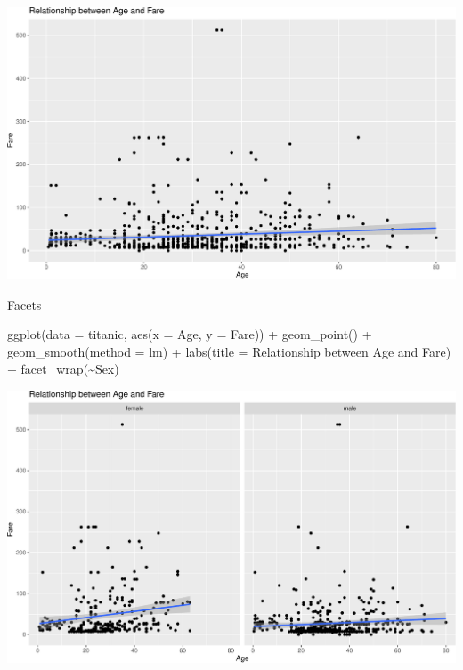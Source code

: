 \documentclass[
]{book}
\newenvironment{Shaded}{\begin{snugshade}}{\end{snugshade}}
\newcommand{\AttributeTok}[1]{\textcolor[rgb]{0.77,0.63,0.00}{#1}}
\newcommand{\FunctionTok}[1]{\textcolor[rgb]{0.00,0.00,0.00}{#1}}
\newcommand{\NormalTok}[1]{#1}
\newcommand{\SpecialCharTok}[1]{\textcolor[rgb]{0.00,0.00,0.00}{#1}}
\newcommand{\StringTok}[1]{\textcolor[rgb]{0.31,0.60,0.02}{#1}}
\begin{document}
\includegraphics{figures/unnamed-chunk-138-1.pdf}

Facets

\begin{Shaded}
\begin{Highlighting}[]
\FunctionTok{ggplot}\NormalTok{(}\AttributeTok{data =}\NormalTok{ titanic, }\FunctionTok{aes}\NormalTok{(}\AttributeTok{x =}\NormalTok{ Age, }\AttributeTok{y =}\NormalTok{ Fare)) }\SpecialCharTok{+} \FunctionTok{geom\_point}\NormalTok{() }\SpecialCharTok{+} \FunctionTok{geom\_smooth}\NormalTok{(}\AttributeTok{method =} \StringTok{\textquotesingle{}lm\textquotesingle{}}\NormalTok{) }\SpecialCharTok{+} \FunctionTok{labs}\NormalTok{(}\AttributeTok{title =} \StringTok{\textquotesingle{}Relationship between Age and Fare\textquotesingle{}}\NormalTok{) }\SpecialCharTok{+}
  \FunctionTok{facet\_wrap}\NormalTok{(}\SpecialCharTok{\textasciitilde{}}\NormalTok{Sex)}
\end{Highlighting}
\end{Shaded}

\includegraphics{figures/unnamed-chunk-139-1.pdf}
\end{document}
